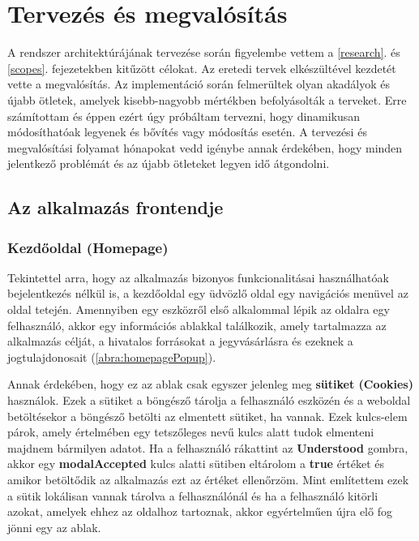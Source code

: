 \chapter{Tervezés és megvalósítás}

A rendszer architektúrájának tervezése során figyelembe vettem a \ref{research}. és \ref{scopes}. fejezetekben kitűzött célokat. Az eretedi tervek elkészültével kezdetét vette a megvalósítás. Az implementáció során felmerültek olyan akadályok és újabb ötletek, amelyek kisebb-nagyobb mértékben befolyásolták a terveket. Erre számítottam és éppen ezért úgy próbáltam tervezni, hogy dinamikusan módosíthatóak legyenek és bővítés vagy módosítás esetén. A tervezési és megvalósítási folyamat hónapokat vedd igénybe annak érdekében, hogy minden jelentkező problémát és az újabb ötleteket legyen idő átgondolni.

\section {Az alkalmazás frontendje}

\subsection {Kezdőoldal (Homepage)}

Tekintettel arra, hogy az alkalmazás bizonyos funkcionalitásai használhatóak bejelentkezés nélkül is, a kezdőoldal egy üdvözlő oldal egy navigációs menüvel az oldal tetején. Amennyiben egy eszközről első alkalommal lépik az oldalra egy felhasználó, akkor egy információs ablakkal találkozik, amely tartalmazza az alkalmazás célját, a hivatalos forrásokat a jegyvásárlásra és ezeknek a jogtulajdonosait (\ref{abra:homepagePopup}).

Annak érdekében, hogy ez az ablak csak egyszer jelenleg meg \textbf{sütiket (Cookies)} használok. Ezek a sütiket a böngésző tárolja a felhasználó eszközén és a weboldal betöltésekor a böngésző betölti az elmentett sütiket, ha vannak. Ezek kulcs-elem párok, amely értelmében egy tetszőleges nevű kulcs alatt tudok elmenteni majdnem bármilyen adatot. Ha a felhasználó rákattint az \textbf{Understood} gombra, akkor egy \textbf{modalAccepted} kulcs alatti sütiben eltárolom a \textbf{true} értéket és amikor betöltődik az alkalmazás ezt az értéket ellenőrzöm.
Mint említettem ezek a sütik lokálisan vannak tárolva a felhasználónál és ha a felhasználó kitörli azokat, amelyek ehhez az oldalhoz tartoznak, akkor egyértelműen újra elő fog jönni egy az ablak.

